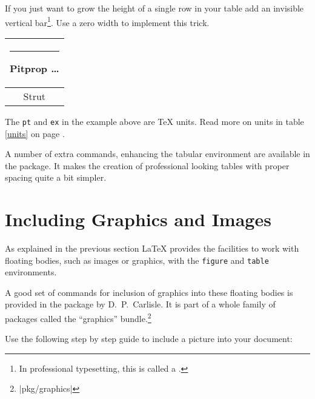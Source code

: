 If you just want to grow the height of a single row in your table add an invisible vertical bar\footnote{In professional typesetting,
this is called a .}. Use a zero width  to implement this trick.

\begin{example}
\begin{tabular}{|c|}
\hline
\rule{1pt}{4ex}Pitprop \ldots\\
\hline
\rule{0pt}{4ex}Strut\\
\hline
\end{tabular}
\end{example}

The \texttt{pt} and \texttt{ex} in the example above are \TeX{} units. Read more
on units in table \ref{units} on page \pageref{units}.

A number of extra commands, enhancing the tabular environment are available
in the  package. It makes the creation of professional looking
tables with proper spacing quite a bit simpler.



\section{Including Graphics and Images}\label{eps}

As explained in the previous section \LaTeX{} provides the facilities to work with floating bodies,
such as images or graphics, with the \texttt{figure} and
\texttt{table} environments.

A good set of commands for inclusion of graphics into these floating bodies is provided in the
 package by D.~P.~Carlisle. It is part of a whole family
of packages called the ``graphics''
bundle.\footnote{\CTAN|pkg/graphics|}

Use the following step by step guide to
include a picture into your document:

